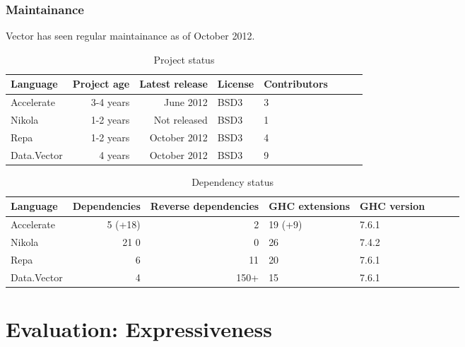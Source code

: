 \subsection{Maintainance} Vector has seen regular maintainance as of October 2012.

\begin{table}
  \centering
  \begin{tabular}{l|rrllllr}
    Language    & Project age & Latest release & License & Contributors \\ \hline
    Accelerate  & 3-4 years   & June 2012      & BSD3    & 3 \\
    Nikola      & 1-2 years   & Not released   & BSD3    & 1 \\
    Repa        & 1-2 years   & October 2012   & BSD3    & 4 \\
    Data.Vector & 4 years     & October 2012   & BSD3    & 9 \\
  \end{tabular}
  \caption{Project status}
  \label{tab:project_status}
\end{table}

\begin{table}
  \centering
  \begin{tabular}{l|rrllllr}
    Language    & Dependencies & Reverse dependencies & GHC extensions & GHC version \\ \hline
    Accelerate  & 5 (+18)      & 2                    & 19 (+9)        & 7.6.1 \\
    Nikola      & 21 0         & 0                    & 26             & 7.4.2 \\
    Repa        & 6            & 11                   & 20             & 7.6.1 \\
    Data.Vector & 4            & 150+                 & 15             & 7.6.1 \\
  \end{tabular}
  \caption{Dependency status}
  \label{tab:dependency_status}
\end{table}


\chapter{Evaluation: Expressiveness}


